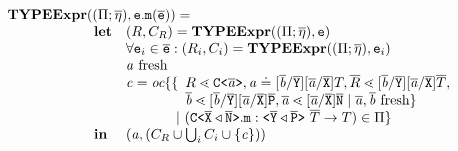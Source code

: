 \documentclass[a4paper,USenglish,cleveref, autoref, thm-restate, anonymous]{lipics-v2021}
\begin{document}
\noindent
$\begin{array}{@{}l@{}l}
\typeExpr{} & (({\mtypeEnvironment} ;
  \overline{\localVarAssumption}), \texttt{e}.\mathtt{m}(\overline{\texttt{e}}) ) = \\
& \begin{array}{ll}
\textbf{let}& ({R}, \consSet_R) = \typeExpr(({\mtypeEnvironment} ;
  \overline{\localVarAssumption}), \texttt{e})\\
& \forall \texttt{e}_i \in \ol{e} : (R_i, \consSet_i) = \typeExpr(({\mtypeEnvironment} ;
  \overline{\localVarAssumption}), \texttt{e}_i)  \\
                    & \tv{a} \text{ fresh} \\
& \begin{array}{@{}l@{}l}
  \constraint = \orCons\set{ & \{
            \begin{array}[t]{l}
              {R} \lessdot \exptype{C}{\ol{\tv{a}}}, \tv{a} \doteq [\ol{\tv{b}}/\ol{Y}][\ol{\tv{a}}/\ol{X}]{T},
              \overline{R} \lessdot [\ol{\tv{b}}/\ol{Y}][\ol{\tv{a}}/\ol{X}]\overline{T} , \\
              \ol{\tv{b}} \lessdot [\ol{\tv{b}}/\ol{Y}][\ol{\tv{a}}/\ol{X}]\ol{P} ,
              \ol{\tv{a}} \lessdot [\ol{\tv{a}}/\ol{X}]\ol{N}
              \mid \overline{\tv{a}}, \overline{\tv{b}} \text{ fresh} \}
            \end{array}\\
      & \ |\ (\exptype{C}{\ol{X} \triangleleft \ol{N}}.\texttt{m} : \exptype{}{\ol{Y} \triangleleft \ol{P}} \ \overline{T} \to {T}) \in {\mtypeEnvironment} }
  \end{array}\\
\mathbf{in} & (\tv{a},(\consSet_R \cup \bigcup_i \consSet_i \cup \set{\constraint}))
\end{array}
\end{array}
$
\end{document}
